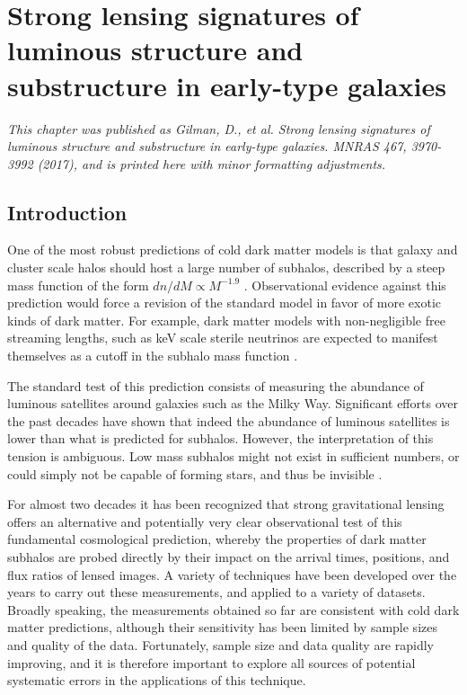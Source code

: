 \def\kex{{\kappa_{\rm e}}}
\def\RE{{R_{\rm E}}}
\def\Reff{{R_{\rm eff}}}
\def\gd{{\gamma_{\rm d}}}
\def\fd{{f_{\rm dm}}}
\def\ra{{r_{\rm a}}}

\chapter{Strong lensing signatures of luminous structure and substructure in early-type galaxies}
\textit{This chapter was published as Gilman, D., et al. Strong lensing signatures of luminous structure and substructure in early-type galaxies. MNRAS 467, 3970-3992 (2017), and is printed here with minor formatting adjustments.}

\section{Introduction}

One of the most robust predictions of cold dark matter models is that
galaxy and cluster scale halos should host a large number of subhalos,
described by a steep mass function of the form $dn/dM\propto M^{-1.9}$ \cite{Kly++99,Moo++99,Kra09}. Observational evidence against this prediction would force a revision of the standard model in favor of more exotic kinds of dark matter. For example, dark matter models with non-negligible free streaming lengths, such as keV scale sterile neutrinos are expected to manifest themselves as a cutoff in the subhalo mass function \cite{Colombi++96,Vogelsberger++16,Bose++16,Lovell++16,Nie++13,Menci++16}.

The standard test of this prediction consists of measuring the abundance of luminous satellites around galaxies such as the Milky Way. Significant efforts over the past decades have shown that indeed the abundance of luminous satellites is lower than what is predicted for subhalos. However, the interpretation of this tension is ambiguous. Low mass subhalos might not exist in sufficient numbers, or could simply not be capable of forming stars, and thus be invisible \cite[]{Nie++13,Nie++16,Guo++2011,Starkenburg++13,Wetzel++16,Sawala++16,DespVeg16}.

For almost two decades it has been recognized that strong gravitational lensing offers an alternative and potentially very clear observational test of this fundamental cosmological prediction, whereby the properties of dark matter subhalos are probed directly by their impact on the arrival times, positions, and flux ratios of lensed images. A variety of techniques have been developed over the years to carry out these measurements, and applied to a variety of datasets. Broadly speaking, the measurements obtained so far are consistent with cold dark matter predictions, although their sensitivity has been limited by sample sizes and quality of the data. Fortunately, sample size and data quality are rapidly improving, and it is therefore important to explore all sources of potential systematic errors in the applications of this technique.

